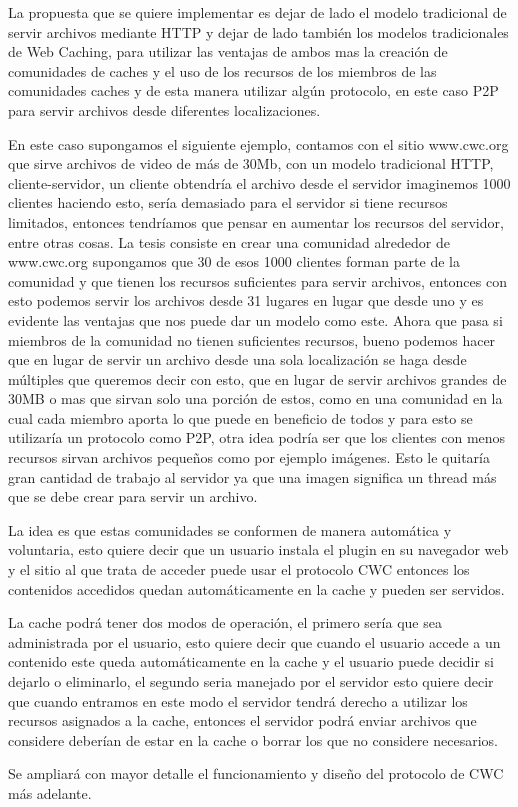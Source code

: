 La propuesta que se quiere implementar es dejar de lado el modelo tradicional de servir archivos mediante HTTP y dejar de lado también los modelos tradicionales de Web Caching, para utilizar las ventajas de ambos mas la creación de comunidades de caches y el uso de los recursos de los miembros de las comunidades caches y de esta manera utilizar algún protocolo, en este caso P2P para servir archivos desde diferentes localizaciones.

En este caso supongamos el siguiente ejemplo, contamos con el sitio www.cwc.org que sirve archivos de video de más de 30Mb, con un modelo tradicional HTTP, cliente-servidor, un cliente obtendría el archivo desde el servidor  imaginemos 1000 clientes haciendo esto, sería demasiado para el servidor si tiene recursos limitados, entonces tendríamos que pensar en aumentar los recursos del servidor, entre otras cosas. La tesis consiste en crear una comunidad alrededor de www.cwc.org supongamos que 30 de esos 1000 clientes forman parte de la comunidad y que tienen los recursos suficientes para servir archivos, entonces con esto podemos servir los archivos desde 31 lugares en lugar que desde uno y es evidente las ventajas que nos puede dar un modelo como este. Ahora que pasa si miembros de la comunidad no tienen suficientes recursos, bueno podemos hacer que en lugar de servir un archivo desde una sola localización se haga desde múltiples que queremos decir con esto, que en lugar de servir archivos grandes de 30MB o mas que sirvan solo una porción de estos, como en una comunidad en la cual cada miembro aporta lo que puede en beneficio de todos y para esto se utilizaría un protocolo como P2P, otra idea podría ser que los clientes con menos recursos sirvan archivos pequeños como por ejemplo imágenes. Esto le quitaría gran cantidad de trabajo al servidor ya que una imagen significa un thread más que se debe crear para servir un archivo.

La idea es que estas comunidades se conformen de manera automática y voluntaria, esto quiere decir que un usuario instala el plugin en su navegador web y el sitio al que trata de acceder puede usar el protocolo CWC entonces los contenidos accedidos quedan automáticamente en la cache y pueden ser servidos.

La cache podrá tener dos modos de operación, el primero sería que sea administrada por el usuario, esto quiere decir que cuando el usuario accede a un contenido este queda automáticamente en la cache y el usuario puede decidir si dejarlo o eliminarlo, el segundo seria manejado por el servidor esto quiere decir que cuando entramos en este modo el servidor tendrá derecho a utilizar los recursos asignados a la cache, entonces el servidor podrá enviar archivos que considere deberían de estar en la cache o borrar los que no considere necesarios.

Se ampliará con mayor detalle el funcionamiento y diseño del protocolo de CWC más adelante.


